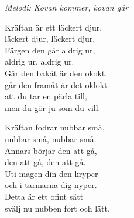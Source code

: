 {\footnotesize\textit{Melodi: Kovan kommer, kovan går}}\par
\vspace{10pt}
Kräftan är ett läckert djur,\\
läckert djur, läckert djur.\\
Färgen den går aldrig ur,\\
aldrig ur, aldrig ur.\\
Går den bakåt är den okokt,\\
går den framåt är det oklokt\\
att du tar en pärla till,\\
men du gör ju som du vill.\par
\vspace{10pt}
Kräftan fodrar nubbar små,\\
nubbar små, nubbar små.\\
Annars börjar den att gå,\\
den att gå, den att gå.\\
Uti magen din den kryper\\
och i tarmarna dig nyper.\\
Detta är ett ofint sätt\\
svälj nu nubben fort och lätt.
